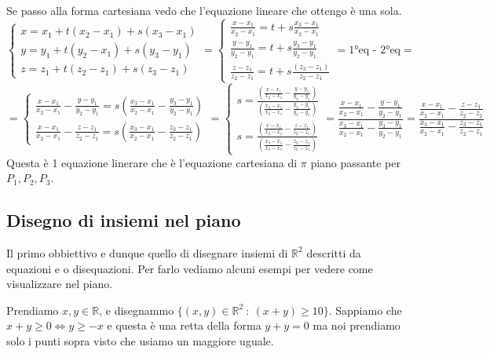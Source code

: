 Se passo alla forma cartesiana vedo che l'equazione lineare che ottengo è una sola.
\[\begin{cases}x = x_1 + t(x_2 - x_1) + s(x_3 - x_1)\\ y = y_1 + t(y_2 - x_1) + s(y_3 - y_1)\\z = z_1 + t(z_2 - z_1) + s(z_3 - z_1)\end{cases} = \begin{cases}\frac{x - x_1}{x_2 - x_1} = t + s \frac{x_3 - x_1}{x_2 - x_1}\\ \frac{y-y_1}{y_2-y_1} = t + s\frac{y_3-y_1}{y_2-y_1}\\ \frac{z-z_1}{z_2-z_1} = t + s\frac{(z_3 - z_1)}{z_2 - z_1}\end{cases} = \text{1°eq - 2°eq}  = \]
\[= \begin{cases}\frac{x-x_1}{x_2-x_1} - \frac{y-y_1}{y_2-y_1} = s(\frac{x_3-x_1}{x_2-x_1} - \frac{y_3 - y_1}{y_2-y_1})\\\frac{x-x_1}{x_2-x_1} - \frac{z - z_1}{z_2-z_1} = s(\frac{x_3-x_1}{x_2-x_1} - \frac{z_3 - z_1}{z_2-z_1})\end{cases} = \begin{cases}s = \frac{(\frac{x-x_1}{x_2 - x_1} - \frac{y-y_1}{y_2-y_1})}{(\frac{x_3-x_1}{x_2-x_1} - \frac{y_3 - y_1}{y_2 - y_1})}\\s = \frac{(\frac{x-x_1}{x_2-x_1} - \frac{z -z_1}{z_2 - z_1})}{(\frac{x_3 - x_1}{x_2 - x_1} - \frac{z_3-z_1}{z_2-z_1})}\end{cases} = \frac{\frac{x-x_1}{x_2-x_1} - \frac{y - y_1}{y_2-y_1}}{\frac{x_3-x_1}{x_2-x_1} - \frac{y_3-y_1}{y_2-y_1}} = \frac{\frac{x-x_1}{x_2-x_1} - \frac{z-z_1}{z_2-z_2}}{\frac{x_3 - x_1}{x_2-x_1} - \frac{z_3-z_1}{z_2-z_1}}\]
Questa è 1 equazione linerare che è l'equazione cartesiana di $\pi$ piano passante per $P_1, P_2, P_3$.

\subsection{Disegno di insiemi nel piano}
Il primo obbiettivo e dunque quello di disegnare insiemi di $\mathbb{R}^2$ descritti da equazioni e o disequazioni. Per farlo vediamo alcuni esempi per vedere come visualizzare nel piano.

\begin{example}\label{ess-1}
Prendiamo $x, y \in \mathbb{R}$, e disegnammo $\{(x,y) \in \mathbb{R}^2 \::\: (x+y) \ge1 0\}$. Sappiamo che $x+y \geq 0 \Longleftrightarrow y \geq -x$ e questa è una retta della forma $y + y = 0$ ma noi prendiamo solo i punti sopra visto che usiamo un maggiore uguale. 
\end{example}

